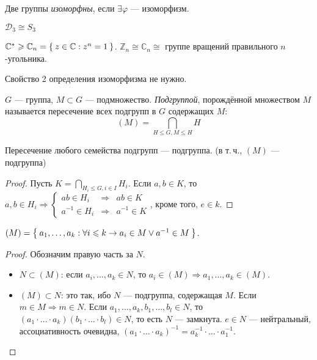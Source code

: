 \begin{define*}
  Две группы \emph{изоморфны}, если $\exists \varphi$ --- изоморфизм.
\end{define*}

\begin{example}
  $\mathcal{D}_3 \cong S_3$
\end{example}

\begin{example}
  $\mathbb{C}^* \geqslant \mathbb{C}_n = \Set{ z \in \mathbb{C}: z^n = 1 }$. 
  $\mathbb{Z}_n \cong \mathbb{C}_n \cong$ группе вращений правильного $n$-угольника.
\end{example}

\begin{exercise}
  Свойство 2 определения изоморфизма не нужно.
\end{exercise}

\begin{define*}
  $G$ --- группа, $M \subset G$ --- подмножество. \emph{Подгруппой}, порождённой множеством $M$ называется пересечение всех подгрупп в $G$ содержащих $M$:
  $$(M) = \bigcap_{H\le G, M\le H}H$$
\end{define*}

\begin{claim}
  Пересечение любого семейства подгрупп --- подгруппа. (в т.\,ч., $(M)$ --- подгруппа)
\end{claim}

\begin{proof}
  Пусть $K = \underset{H_i \le G, i \in I}{\bigcap}H_i$. Если $a, b \in K$, то 
  $a, b \in H_i \Rightarrow 
  \left\{ 
	\begin{aligned}
	  ab \in H_i &\Rightarrow& ab \in K\\ 
	  a^{-1} \in H_i &\Rightarrow& a^{-1} \in K
	\end{aligned}
  \right.$, кроме того, $e \in k$.
\end{proof}

\begin{claim}
  $(M) = \Set{ a_1, \ldots, a_k: \forall i \leqslant k \to a_i \in M \lor a^{-1} \in M }$.
\end{claim}

\begin{proof}
  Обозначим правую часть за $N$.

  \begin{itemize}
	\item $N \subset (M)$: если $a_i, \ldots, a_k \in N$, то $a_i \in (M) \Rightarrow a_1, \ldots, a_k \in (M)$.
	\item $(M) \subset N$: это так, ибо $N$ --- подгруппа, содержащая $M$.
		Если $m\in M\Rightarrow m\in N$. Если $a_{1},\ldots,a_{k},b_{1},\ldots,b_{l}\in N$,
		то $\left(a_{1}\cdot\ldots\cdot a_{k}\right)\left(b_{1}\cdot\ldots\cdot b_{l}\right)\in N$,
		то есть $N$ --- замкнута. $e\in N$ --- нейтральный, ассоциативность
		очевидна, $\left(a_{1}\cdot\ldots\cdot a_{k}\right)^{-1}=a_{k}^{-1}\cdot\ldots\cdot a_{1}^{-1}$.
  \end{itemize}
\end{proof}

